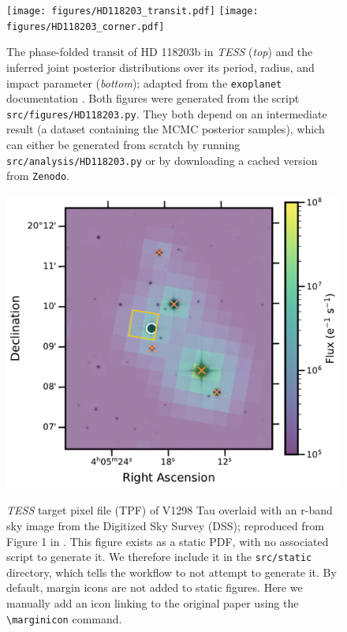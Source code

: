\documentclass[twocolumn]{aastex631}
\begin{document}
\begin{figure}[ht!]
    \begin{centering}
        \texttt{[image: figures/HD118203\_transit.pdf]}
        \texttt{[image: figures/HD118203\_corner.pdf]}
        \caption{
            The phase-folded transit of HD 118203b in \emph{TESS} (\emph{top}) and the inferred joint posterior distributions over its period, radius, and impact parameter (\emph{bottom}); adapted from the \texttt{exoplanet} documentation \citep{ForemanMackey2021}.
            Both figures were generated from the script \texttt{src/figures/HD118203.py}. 
            They both depend on an intermediate result (a dataset containing the MCMC posterior samples), which can either be generated from scratch by running \texttt{src/analysis/HD118203.py} or by downloading a cached version from \texttt{Zenodo}.
        }
        \label{fig:HD118203}
    \end{centering}
\end{figure}

\begin{figure}[ht!]
    \begin{centering}
        \includegraphics[width=\linewidth]{static/TESSaperture.pdf}
        \caption{
            \emph{TESS} target pixel file (TPF) of V1298 Tau
            overlaid with an r-band sky image from the Digitized Sky Survey (DSS);
            reproduced from Figure 1 in \citet{Feinstein2021}.
            This figure exists as a static PDF, with no associated script to
            generate it.
            We therefore include it in the \texttt{src/static} directory, which tells the workflow to not attempt to generate it. 
            By default, margin icons are not added to static figures.
            Here we manually add an icon linking to the original paper using the \texttt{\textbackslash marginicon} command.
        }
        \label{fig:eclipse}
    \end{centering}
\end{figure}
\end{document}
